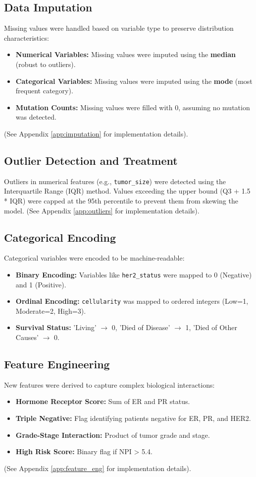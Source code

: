 \subsection{Data Imputation}
Missing values were handled based on variable type to preserve distribution characteristics:
\begin{itemize}
    \item \textbf{Numerical Variables:} Missing values were imputed using the \textbf{median} (robust to outliers).
    \item \textbf{Categorical Variables:} Missing values were imputed using the \textbf{mode} (most frequent category).
    \item \textbf{Mutation Counts:} Missing values were filled with 0, assuming no mutation was detected.
\end{itemize}
(See Appendix \ref{app:imputation} for implementation details).

\subsection{Outlier Detection and Treatment}
Outliers in numerical features (e.g., \texttt{tumor\_size}) were detected using the Interquartile Range (IQR) method. Values exceeding the upper bound (Q3 + 1.5 * IQR) were capped at the 95th percentile to prevent them from skewing the model. (See Appendix \ref{app:outliers} for implementation details).

\subsection{Categorical Encoding}
Categorical variables were encoded to be machine-readable:
\begin{itemize}
    \item \textbf{Binary Encoding:} Variables like \texttt{her2\_status} were mapped to 0 (Negative) and 1 (Positive).
    \item \textbf{Ordinal Encoding:} \texttt{cellularity} was mapped to ordered integers (Low=1, Moderate=2, High=3).
    \item \textbf{Survival Status:} 'Living' $\rightarrow$ 0, 'Died of Disease' $\rightarrow$ 1, 'Died of Other Causes' $\rightarrow$ 0.
\end{itemize}

\subsection{Feature Engineering}
New features were derived to capture complex biological interactions:
\begin{itemize}
    \item \textbf{Hormone Receptor Score:} Sum of ER and PR status.
    \item \textbf{Triple Negative:} Flag identifying patients negative for ER, PR, and HER2.
    \item \textbf{Grade-Stage Interaction:} Product of tumor grade and stage.
    \item \textbf{High Risk Score:} Binary flag if NPI > 5.4.
\end{itemize}
(See Appendix \ref{app:feature_eng} for implementation details).

